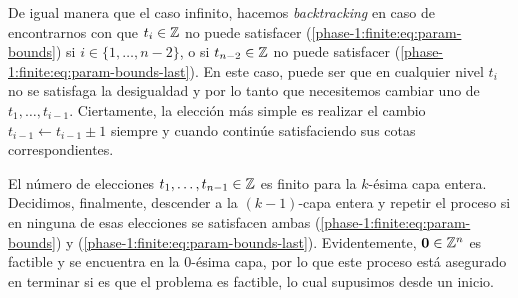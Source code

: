 De igual manera que el caso infinito, hacemos \textit{backtracking} en caso de encontrarnos con que
$t_i \in \mathbb{Z}$ no puede satisfacer (\ref{phase-1:finite:eq:param-bounds}) si $i \in \lbrace 1, \ldots,
n - 2\rbrace$, o si $t_{n - 2} \in \mathbb{Z}$ no puede satisfacer
(\ref{phase-1:finite:eq:param-bounds-last}). En este caso, puede ser que en cualquier nivel $t_i$ no
se satisfaga la desigualdad y por lo tanto que necesitemos cambiar uno de $t_1, \ldots, t_{i -
1}$. Ciertamente, la elección más simple es realizar el cambio $t_{i - 1} \leftarrow t_{i - 1} \pm
1$ siempre y cuando continúe satisfaciendo sus cotas correspondientes.

El número de elecciones $t_1, \ldots, t_{n - 1} \in \mathbb{Z}$ es finito para la $k$-ésima capa entera.
Decidimos, finalmente, descender a la $(k - 1)$-capa entera y repetir el proceso si en ninguna de esas
elecciones se satisfacen ambas (\ref{phase-1:finite:eq:param-bounds}) y
(\ref{phase-1:finite:eq:param-bounds-last}). Evidentemente, $\boldsymbol{0} \in \mathbb{Z}^n$ es factible y se
encuentra en la 0-ésima capa, por lo que este proceso está asegurado en terminar si es que el
problema es factible, lo cual supusimos desde un inicio.

